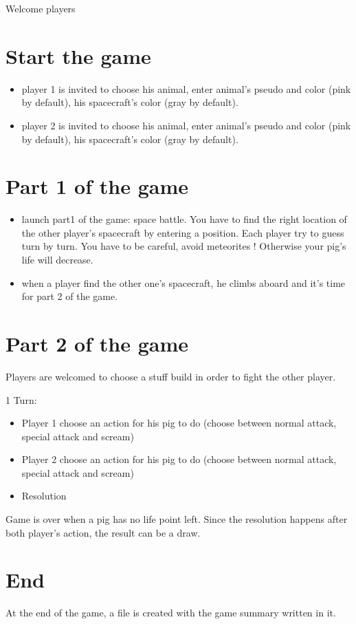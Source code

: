 Welcome players


\section{Start the game}

\begin{itemize}
 \item player 1 is invited to choose his animal, enter animal's pseudo and color (pink by default), his spacecraft's color (gray by default).
 \item player 2 is invited to choose his animal, enter animal's pseudo and color (pink by default), his spacecraft's color (gray by default).
\end{itemize}


\section{Part 1 of the game}

\begin{itemize}
 \item launch part1 of the game: space battle. You have to find the right location of the other player's spacecraft by entering a position. Each player try to guess turn by turn. You have to be careful, avoid meteorites ! Otherwise your pig's life will decrease.
 \item when a player find the other one's spacecraft, he climbs aboard and it's time for part 2 of the game.
\end{itemize}


\section{Part 2 of the game}

Players are welcomed to choose a stuff build in order to fight the other player.

1 Turn:

\begin{itemize}
 \item Player 1 choose an action for his pig to do (choose between normal attack, special attack and scream)
 \item Player 2 choose an action for his pig to do (choose between normal attack, special attack and scream)
 \item Resolution
\end{itemize}

Game is over when a pig has no life point left. Since the resolution happens after both player's action, the result can be a draw.

\section{End}

At the end of the game, a file is created with the game summary written in it.


